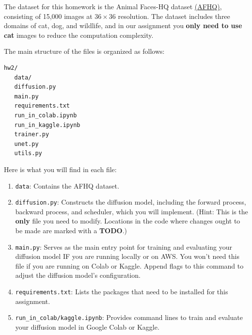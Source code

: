 \documentclass[11pt,addpoints,answers]{exam}
\begin{document}
\begin{questions}
 The dataset for this homework is the Animal Faces-HQ dataset \href{https://github.com/clovaai/stargan-v2/blob/master/README.md#animal-faces-hq-dataset-afhq}{(AFHQ)}, consisting of 15,000 images at $36\times36$ resolution. The dataset includes three domains of cat, dog, and wildlife, and in our assignment you \textbf{only need to use cat} images to reduce the computation complexity.




The main structure of the files is organized as follows:
\begin{verbatim}
hw2/
   data/
   diffusion.py
   main.py
   requirements.txt
   run_in_colab.ipynb
   run_in_kaggle.ipynb
   trainer.py
   unet.py
   utils.py
\end{verbatim}

Here is what you will find in each file:
\begin{enumerate}
    
    \item \lstinline{data}: Contains the AFHQ dataset.
    
    \item \lstinline{diffusion.py}: Constructs the diffusion model, including the forward process, backward process, and scheduler, which you will implement. (Hint: This is the \textbf{only} file you need to modify. Locations in the code where changes ought to be made are marked with a \textbf{TODO}.)

    \item \lstinline{main.py}: Serves as the main entry point for training and evaluating your diffusion model IF you are running locally or on AWS. You won't need this file if you are running on Colab or Kaggle. Append flags to this command to adjust the diffusion model's configuration.
    
    \item \lstinline{requirements.txt}: Lists the packages that need to be installed for this assignment.
    
    \item \lstinline{run_in_colab/kaggle.ipynb}: Provides command lines to train and evaluate your diffusion model in Google Colab or Kaggle.
    

\end{enumerate}
\end{questions}
\end{document}
